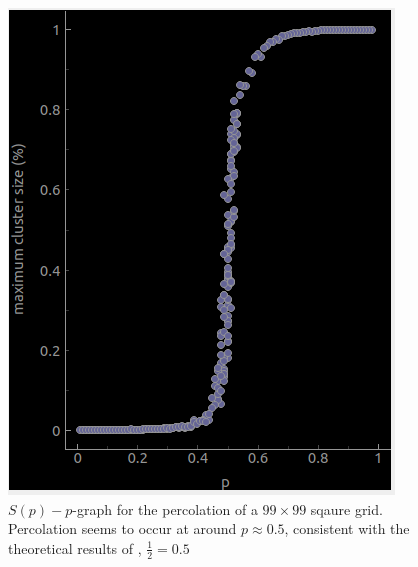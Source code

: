 \documentclass[a4paper,fleqn]{article}
\begin{document}
\begin{figure}[H]
\begin{minipage}{0.3\textwidth}
	\includegraphics*[width=\textwidth]{images/2dgrid}
	\end{minipage}
\caption{$S(p)-p$-graph for the percolation of a $99\times 99$ sqaure grid. Percolation seems to occur at around $p \approx 0.5$, consistent with the theoretical results of \cite{Percolation}, $\frac{1}{2} = 0.5$ }
\end{figure}
\end{document}
